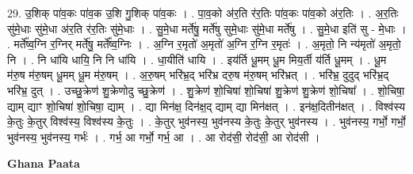 \documentclass[17pt]{extarticle}
\begin{document}
29. उ॒शिक् पा॑व॒कः पा॑व॒क उ॒शि गु॒शिक् पा॑व॒कः । . पा॒व॒को अ॑र॒ति र॑र॒तिः पा॑व॒कः पा॑व॒को अ॑र॒तिः । . अ॒र॒तिः सु॑मे॒धाः सु॑मे॒धा अ॑र॒ति र॑र॒तिः सु॑मे॒धाः । . सु॒मे॒धा मर्ते॑षु॒ मर्ते॑षु सुमे॒धाः सु॑मे॒धा मर्ते॑षु । . सु॒मे॒धा इति॑ सु - मे॒धाः । . मर्ते᳚ष्व॒ग्नि र॒ग्निर् मर्ते॑षु॒ मर्ते᳚ष्व॒ग्निः । . अ॒ग्नि र॒मृतो॑ अ॒मृतो॑ अ॒ग्नि र॒ग्नि र॒मृतः॑ । . अ॒मृतो॒ नि न्य॑मृतो॑ अ॒मृतो॒ नि । . नि धा॑यि धायि॒ नि नि धा॑यि । . धा॒यीति॑ धायि । . इय॑र्ति धू॒मम् धू॒म मिय॒र्ती य॑र्ति धू॒मम् । . धू॒म म॑रु॒ष म॑रु॒षम् धू॒मम् धू॒म म॑रु॒षम् । . अ॒रु॒षम् भरि॑भ्र॒द् भरि॑भ्र दरु॒ष म॑रु॒षम् भरि॑भ्रत् । . भरि॑भ्र॒ दुदुद् भरि॑भ्र॒द् भरि॑भ्र॒ दुत् । . उच्छु॒क्रेण॑ शु॒क्रेणोदु च्छु॒क्रेण॑ । . शु॒क्रेण॑ शो॒चिषा॑ शो॒चिषा॑ शु॒क्रेण॑ शु॒क्रेण॑ शो॒चिषा᳚ । . शो॒चिषा॒ द्याम् द्याꣳ शो॒चिषा॑ शो॒चिषा॒ द्याम् । . द्या मिन॑क्ष॒ दिन॑क्ष॒द् द्याम् द्या मिन॑क्षत् । . इन॑क्ष॒दितीन॑क्षत् । . विश्व॑स्य के॒तुः के॒तुर् विश्व॑स्य॒ विश्व॑स्य के॒तुः । . के॒तुर् भुव॑नस्य॒ भुव॑नस्य के॒तुः के॒तुर् भुव॑नस्य । . भुव॑नस्य॒ गर्भो॒ गर्भो॒ भुव॑नस्य॒ भुव॑नस्य॒ गर्भः॑ । . गर्भ॒ आ गर्भो॒ गर्भ॒ आ । . आ रोद॑सी॒ रोद॑सी॒ आ रोद॑सी । \newline

\textbf{Ghana Paata } \newline
\end{document}
